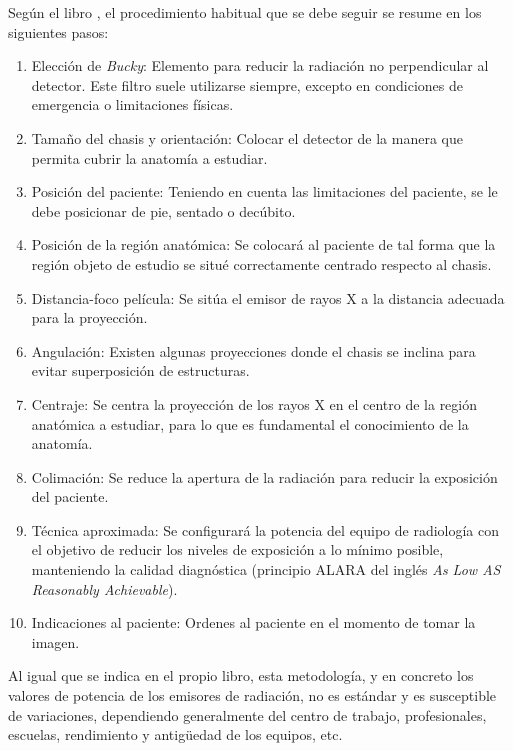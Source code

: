 Según el libro \cite{manualpractico}, el procedimiento habitual que se debe seguir se resume en los siguientes pasos:
\begin{enumerate}
    \item Elección de \emph{Bucky}: Elemento para reducir la radiación no perpendicular al detector. Este filtro suele utilizarse siempre, excepto en condiciones de emergencia o limitaciones físicas.
    \item Tamaño del chasis y orientación: Colocar el detector de la manera que permita cubrir la anatomía a estudiar.
    \item Posición del paciente: Teniendo en cuenta las limitaciones del paciente, se le debe posicionar de pie, sentado o decúbito.
    \item Posición de la región anatómica: 
    Se colocará al paciente de tal forma que la región objeto de estudio se situé correctamente centrado respecto al chasis.
    \item Distancia-foco película: Se sitúa el emisor de rayos X a la distancia adecuada para la proyección.
    \item Angulación: Existen algunas proyecciones donde el chasis se inclina para evitar superposición de estructuras.
    \item Centraje: Se centra la proyección de los rayos X en el centro de la región anatómica a estudiar, para lo que es fundamental el conocimiento de la anatomía.
    \item Colimación: Se reduce la apertura de la radiación para reducir la exposición del paciente.
    \item Técnica aproximada: Se configurará la potencia del equipo de radiología con el objetivo de reducir los niveles de exposición a lo mínimo posible, manteniendo la calidad diagnóstica (principio ALARA del inglés \emph{As Low AS Reasonably Achievable}\cite{manualpractico}). 
    \item Indicaciones al paciente: Ordenes al paciente en el momento de tomar la imagen.
\end{enumerate}

Al igual que se indica en el propio libro, esta metodología, y en concreto los valores de potencia de los emisores de radiación, no es estándar y es susceptible de variaciones, dependiendo generalmente del centro de trabajo, profesionales, escuelas, rendimiento y antigüedad de los equipos, etc. 



